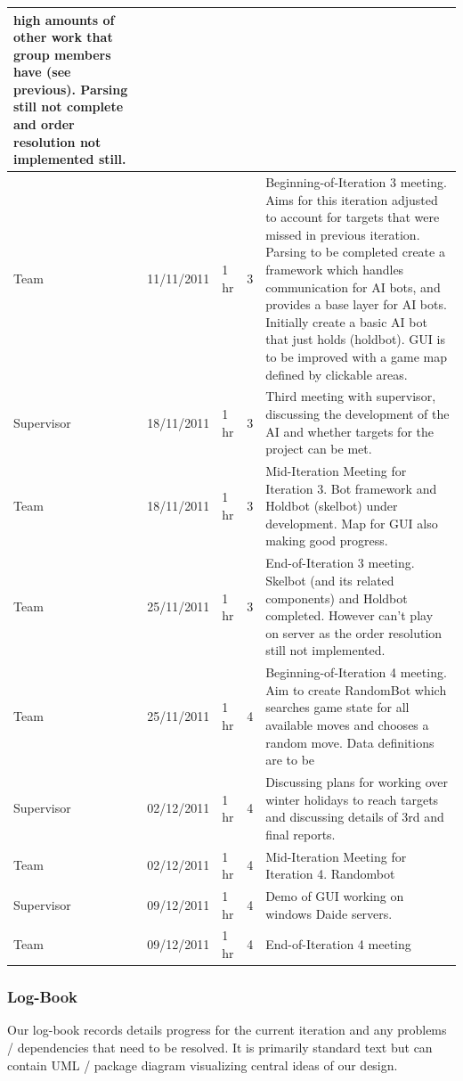 \documentclass[11pt]{article} \usepackage{fullpage} \usepackage{cite}
\begin{document}
\begin{center}
{\begin{tabular}{ | l | l | l | l | p{12cm} |}
    high amounts of other work that group members have (see previous). Parsing
    still not complete and order resolution not implemented still. \\ \hline
    Team & 11/11/2011 & 1 hr & 3 & Beginning-of-Iteration 3 meeting. Aims for
    this iteration adjusted to account for targets that were missed in previous
    iteration. Parsing to be completed create a framework which handles
    communication for AI bots, and provides a base layer for AI bots. Initially
    create a basic AI bot that just holds (holdbot). GUI is to be improved with
    a game map defined by clickable areas. \\ \hline Supervisor & 18/11/2011 & 1
    hr & 3 & Third meeting with supervisor, discussing the development of the AI
    and whether targets for the project can be met.  \\ \hline Team & 18/11/2011
    & 1 hr & 3 & Mid-Iteration Meeting for Iteration 3. Bot framework and
    Holdbot (skelbot) under development. Map for GUI also making good
    progress. \\ \hline Team & 25/11/2011 & 1 hr & 3 & End-of-Iteration 3
    meeting. Skelbot (and its related components) and Holdbot completed. However
    can't play on server as the order resolution still not
    implemented. \\ \hline Team & 25/11/2011 & 1 hr & 4 & Beginning-of-Iteration
    4 meeting. Aim to create RandomBot which searches game state for all
    available moves and chooses a random move. Data definitions are to be
    \\ \hline Supervisor & 02/12/2011 & 1 hr & 4 & Discussing plans for working
    over winter holidays to reach targets and discussing details of 3rd and
    final reports. \\ \hline Team & 02/12/2011 & 1 hr & 4 & Mid-Iteration
    Meeting for Iteration 4. Randombot \\ \hline Supervisor & 09/12/2011 & 1 hr
    & 4 & Demo of GUI working on windows Daide servers. \\ \hline Team &
    09/12/2011 & 1 hr & 4 & End-of-Iteration 4 meeting \\ \hline
    
    \end{tabular}
}

\end{center}

\subsubsection{Log-Book}
Our log-book records details progress for the current iteration and any problems
/ dependencies that need to be resolved. It is primarily standard text but can
contain UML / package diagram visualizing central ideas of our design.
\end{document}
